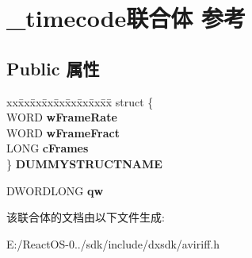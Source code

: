 \hypertarget{union__timecode}{}\section{\+\_\+timecode联合体 参考}
\label{union__timecode}
\subsection*{Public 属性}
\begin{DoxyCompactItemize}
\item 
\mbox{\label{union__timecode_a9ac5404ea7180a0480123824e259d660}} 
\begin{tabbing}
xx\=xx\=xx\=xx\=xx\=xx\=xx\=xx\=xx\=\kill
struct \{\\
\>WORD {\bfseries wFrameRate}\\
\>WORD {\bfseries wFrameFract}\\
\>LONG {\bfseries cFrames}\\
\} {\bfseries DUMMYSTRUCTNAME}\\

\end{tabbing}\item 
\mbox{\label{union__timecode_a1ae00c82e84c948d21717ebb5455c599}} 
D\+W\+O\+R\+D\+L\+O\+NG {\bfseries qw}
\end{DoxyCompactItemize}


该联合体的文档由以下文件生成\+:\begin{DoxyCompactItemize}
\item 
E\+:/\+React\+O\+S-\/0../sdk/include/dxsdk/aviriff.\+h\end{DoxyCompactItemize}

